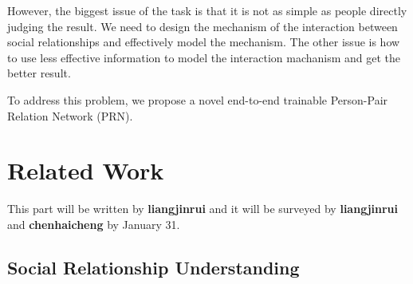 \documentclass{article}
\begin{document}
However, the biggest issue of the task is that it is not as simple as people directly judging the result. We need to design the mechanism of the interaction between social relationships and effectively model the mechanism. The other issue is how to use less effective information to model the interaction machanism and get the better result.

To address this problem, we propose a novel end-to-end trainable Person-Pair Relation Network (PRN).

\section{Related Work}

This part will be written by {\bf liangjinrui} and it will be surveyed by {\bf liangjinrui} and {\bf chenhaicheng} by January 31.

\subsection{Social Relationship Understanding}
\end{document}
